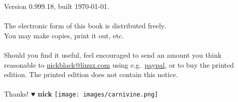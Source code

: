 \clearpage
\noindent{}Version 0.999.18, built \today.\\
\\
The electronic form of this book is distributed freely.\\
You may make copies, print it out, etc.\\
\\
Should you find it useful, feel encouraged to send an amount you think reasonable to
  \href{mailto:nickblack@linux.com}{nickblack@linux.com} using
  e.g.\ \href{https://paypal.me/dankamongmen}{paypal},
  or to buy the printed edition.
The printed edition does not contain this notice.\\
\\
Thanks! {\textbf{♥ nick}}
\vfill\texttt{[image: images/carnivine.png]}\vfill
